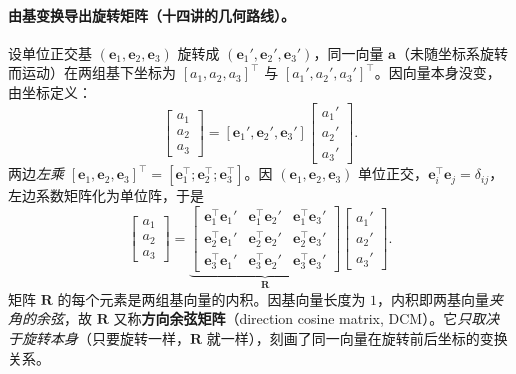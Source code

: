 \paragraph{由基变换导出旋转矩阵（十四讲的几何路线）。}
设单位正交基 $(\mathbf{e}_1,\mathbf{e}_2,\mathbf{e}_3)$ 旋转成 $(\mathbf{e}_1',\mathbf{e}_2',\mathbf{e}_3')$，同一向量 $\mathbf{a}$（未随坐标系旋转而运动）在两组基下坐标为 $[a_1,a_2,a_3]^\top$ 与 $[a_1',a_2',a_3']^\top$。因向量本身没变，由坐标定义：
\begin{equation}
  [\mathbf{e}_1,\mathbf{e}_2,\mathbf{e}_3]\begin{bmatrix}a_1\\a_2\\a_3\end{bmatrix}
  =[\mathbf{e}_1',\mathbf{e}_2',\mathbf{e}_3']\begin{bmatrix}a_1'\\a_2'\\a_3'\end{bmatrix}.
  \label{eq:rb-samevec}
\end{equation}
两边\emph{左乘} $[\mathbf{e}_1,\mathbf{e}_2,\mathbf{e}_3]^\top=[\mathbf{e}_1^\top;\mathbf{e}_2^\top;\mathbf{e}_3^\top]$。因 $(\mathbf{e}_1,\mathbf{e}_2,\mathbf{e}_3)$ 单位正交，$\mathbf{e}_i^\top\mathbf{e}_j=\delta_{ij}$，左边系数矩阵化为单位阵，于是
\begin{equation}
  \begin{bmatrix}a_1\\a_2\\a_3\end{bmatrix}
  =\underbrace{\begin{bmatrix}\mathbf{e}_1^\top\mathbf{e}_1'&\mathbf{e}_1^\top\mathbf{e}_2'&\mathbf{e}_1^\top\mathbf{e}_3'\\
  \mathbf{e}_2^\top\mathbf{e}_1'&\mathbf{e}_2^\top\mathbf{e}_2'&\mathbf{e}_2^\top\mathbf{e}_3'\\
  \mathbf{e}_3^\top\mathbf{e}_1'&\mathbf{e}_3^\top\mathbf{e}_2'&\mathbf{e}_3^\top\mathbf{e}_3'\end{bmatrix}}_{\mathbf{R}}
  \begin{bmatrix}a_1'\\a_2'\\a_3'\end{bmatrix}.
  \label{eq:R-derive}
\end{equation}
矩阵 $\mathbf{R}$ 的每个元素是两组基向量的内积。因基向量长度为 $1$，内积即两基向量\emph{夹角的余弦}，故 $\mathbf{R}$ 又称\textbf{方向余弦矩阵}（direction cosine matrix, DCM）。它\emph{只取决于旋转本身}（只要旋转一样，$\mathbf{R}$ 就一样），刻画了同一向量在旋转前后坐标的变换关系。

